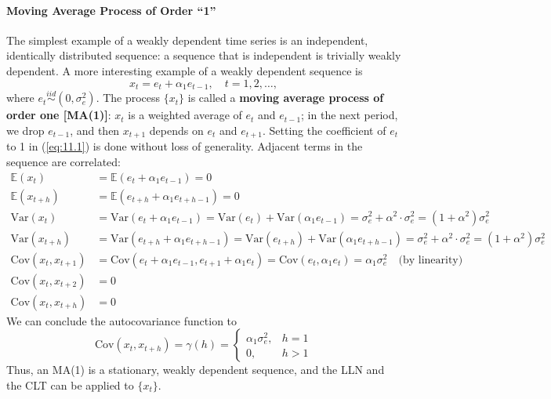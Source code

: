 \documentclass[a4paper, 10pt]{article}
\theoremstyle{definition}	%
\begin{document}
\paragraph{Moving Average Process of Order “1”}
The simplest example of a weakly dependent time series is an independent, identically distributed sequence: a sequence that is independent is trivially weakly dependent. A more interesting example of a weakly dependent sequence is
\begin{equation}
x_t = e_t + \alpha_1 e_{t-1}, \quad t = 1, 2, \ldots,
\label{eq:11.1}
\end{equation}
where \( e_t \overset{iid}{\sim} (0, \sigma_e^2) \).
The process \( \{x_t\} \) is called a \textbf{moving average process of order one [MA(1)]}: \( x_t \) is a weighted average of \( e_t \) and \( e_{t-1} \); in the next period, we drop \( e_{t-1} \), and then \( x_{t+1} \) depends on \( e_t \) and \( e_{t+1} \). Setting the coefficient of \( e_t \) to 1 in (\ref{eq:11.1}) is done without loss of generality. Adjacent terms in the sequence are correlated:
\begin{align*}
    \mathbb{E}(x_t) &= \mathbb{E}(e_t + \alpha_1 e_{t-1}) = 0 \\
    \mathbb{E}(x_{t+h}) &= \mathbb{E}(e_{t+h} + \alpha_1 e_{t+h-1}) = 0 \\
    \mathrm{Var}(x_t) &= \mathrm{Var}(e_t + \alpha_1 e_{t-1}) = \mathrm{Var}(e_t) + \mathrm{Var}(\alpha_1 e_{t-1}) = \sigma_e^2 + \alpha^2 \cdot \sigma_e^2 = (1 + \alpha^2)\sigma_e^2\\
    \mathrm{Var}(x_{t+h}) &= \mathrm{Var}(e_{t+h} + \alpha_1 e_{t+h-1}) = \mathrm{Var}(e_{t+h}) + \mathrm{Var}(\alpha_1 e_{t+h-1}) = \sigma_e^2 + \alpha^2 \cdot \sigma_e^2 = (1 + \alpha^2)\sigma_e^2\\
    \mathrm{Cov}(x_t, x_{t+1}) &= \mathrm{Cov}(e_t+\alpha_1e_{t-1}, e_{t+1}+\alpha_1e_t) = \mathrm{Cov}(e_t, \alpha_1e_t) = \alpha_1\sigma_e^2 \quad \text{(by linearity)}\\
    \mathrm{Cov}(x_t, x_{t+2}) &= 0\\
    \mathrm{Cov}(x_t, x_{t+h}) &= 0
\end{align*}
We can conclude the autocovariance function to 
\begin{equation*}
    \mathrm{Cov}(x_t, x_{t+h}) = \gamma(h) = 
    \begin{cases}
        \alpha_1\sigma_e^2, &  h=1\\
        0, & h >1
    \end{cases}
\end{equation*}
Thus, an MA(1) is a stationary, weakly dependent sequence, and the LLN and the CLT can be applied to \( \{x_t\} \).
\end{document}

